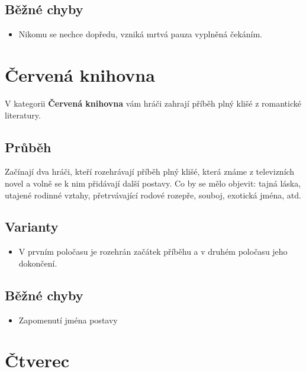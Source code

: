  
\subsection{ Běžné chyby } \begin{itemize}
\item  Nikomu se nechce dopředu, vzniká mrtvá pauza vyplněná čekáním.
\end{itemize}
 
 
 
 
 
\needspace{5cm} \section{Červená knihovna} \label{červená knihovna}  
 
 
V kategorii \textbf{Červená knihovna}{} vám hráči zahrají příběh plný klišé z romantické literatury. 
 
 
\subsection{Průběh} Začínají dva hráči, kteří rozehrávají příběh plný klišé, která známe z televizních novel a volně se k nim přidávají další postavy. Co by se mělo objevit: tajná láska, utajené rodinné vztahy, přetrvávající rodové rozepře, souboj, exotická jména, atd. 
 
\subsection{ Varianty } \begin{itemize}
\item V prvním poločasu je rozehrán začátek příběhu a v druhém poločasu jeho dokončení.
\end{itemize}
 
 
\subsection{ Běžné chyby } \begin{itemize}
\item Zapomenutí jména postavy
\end{itemize}
 
 
 
 
 
\needspace{5cm} \section{Čtverec} \label{čtverec}  
 
